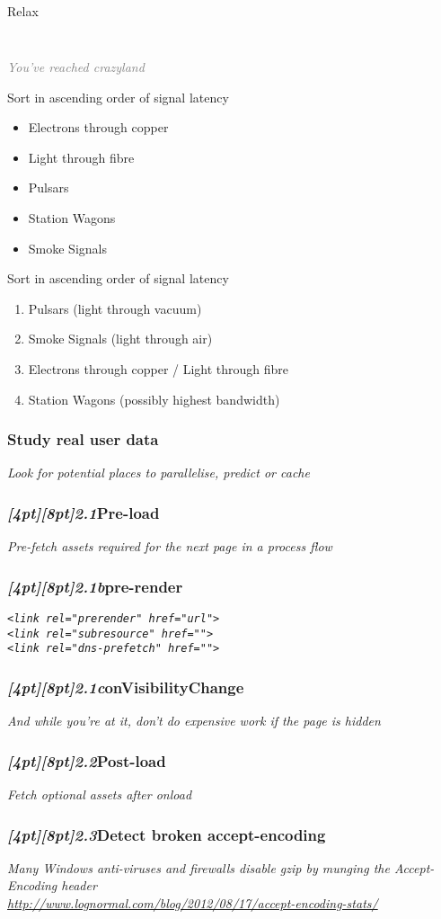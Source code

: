 \documentclass{beamer}
\newcommand{\sn}[1]{\textrm{\textit{\Huge{\raisebox{-3pt}[4pt][8pt]{\textcolor{f2elblue}{#1}}}}}\hspace{4pt}}
\newcommand{\innersplash}[1]{
  \begin{center}
    \Large \textrm{\textit{ #1 } }
  \end{center}
}
\newcommand{\splashslide}[2][{}]{
  \begin{frame}
  \frametitle{#1}
  \innersplash{#2}
  \end{frame}
}
\newcommand{\leadinslide}[2]{
  \splashslide{
     {\fontsize{150}{20}\selectfont{\raisebox{0pt}[90pt][0pt]{\textcolor{light-gray}{#1}}}} \\ \huge \textcolor{gray}{#2}
  }
}
\begin{document}
\begin{frame}{Relax}
\end{frame}

\leadinslide{2}{You've reached crazyland}

\begin{frame}{Sort in ascending order of signal latency}
\begin{itemize}
  \item Electrons through copper
  \item Light through fibre
  \item Pulsars
  \item Station Wagons
  \item Smoke Signals
\end{itemize}
\end{frame}

\begin{frame}{Sort in ascending order of signal latency}
\begin{enumerate}
  \item Pulsars (light through vacuum)
  \item Smoke Signals (light through air)
  \item Electrons through copper / Light through fibre
  \item Station Wagons (possibly highest bandwidth)
\end{enumerate}
\end{frame}

\splashslide[Study real user data]{Look for potential places to parallelise, predict or cache}

\splashslide[\sn{2.1}Pre-load]{Pre-fetch assets required for the next page in a process flow}

\splashslide[\sn{2.1b}pre-render]{\texttt{<link rel="prerender" href="url">} \\ \vfill \texttt{<link rel="subresource" href="">} \\ \vfill \texttt{<link rel="dns-prefetch" href="">} }

\splashslide[\sn{2.1c}onVisibilityChange]{And while you're at it, don't do expensive work if the page is hidden}

\splashslide[\sn{2.2}Post-load]{Fetch optional assets after onload}

\splashslide[\sn{2.3}Detect broken accept-encoding]{Many Windows anti-viruses and firewalls disable gzip by munging the Accept-Encoding header \\ \vfill \href{http://www.lognormal.com/blog/2012/08/17/accept-encoding-stats/}{\small http://www.lognormal.com/blog/2012/08/17/accept-encoding-stats/}}
\end{document}
